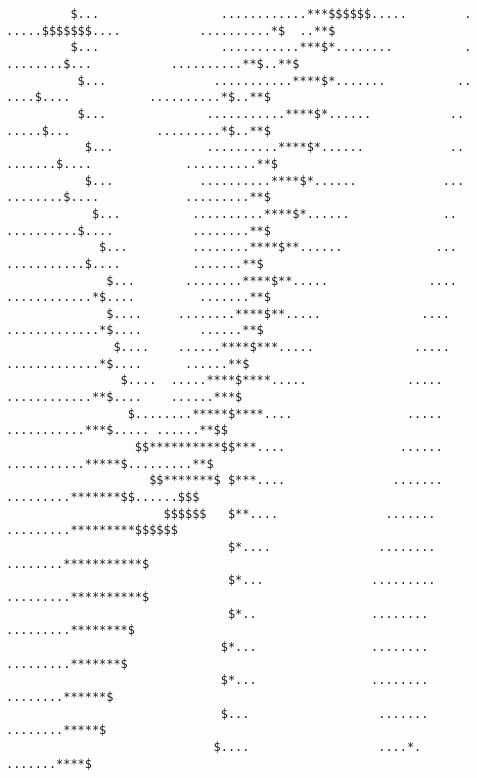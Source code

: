 \begin{verbatim}
         $...                 ............***$$$$$$.....        .          .....$$$$$$$....           ..........*$  ..**$
         $...                 ...........***$*........          .              ........$...           ..........**$..**$
          $...               ...........****$*.......          ..                  ....$....           ..........*$..**$
          $...              ...........****$*......           ..                   .....$...            .........*$..**$
           $...             ..........****$*......            ..                  .......$....             ..........**$
           $...            ..........****$*......            ...                  ........$....            .........**$
            $...          ..........****$*......             ..                  ..........$....           ........**$
             $...         ........****$**......             ...                  ...........$....          .......**$
              $...       ........****$**.....              ....                 ............*$....         .......**$
              $....     ........****$**.....              ....                  .............*$....        ......**$
               $....    ......****$***.....              .....                   .............*$....      ......**$
                $....  .....****$****.....              .....                     ............**$....    ......***$
                 $........*****$****....                .....                      ...........***$..... ......**$$
                  $$**********$$***....                ......                      ...........*****$.........**$
                    $$*******$ $***....               .......                       .........*******$$......$$$
                      $$$$$$   $**....               .......                        .........*********$$$$$$
                               $*....               ........                         ........***********$
                               $*...               .........                         .........**********$
                               $*..                ........                           .........********$
                              $*...                ........                           .........*******$
                              $*...                ........                            ........******$
                              $...                  .......                            ........*****$
                             $....                  ....*.                              .......****$

\end{verbatim}
